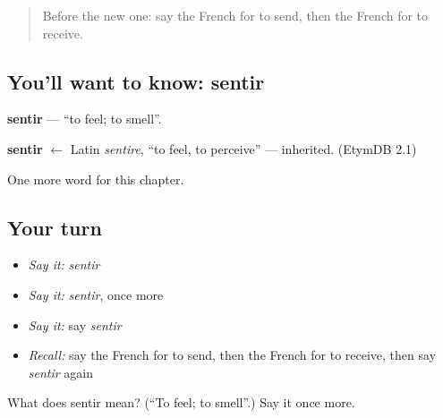 \begin{quote}
Before the new one: say the French for to send, then the French for to receive.
\end{quote}

\subsection*{You'll want to know: sentir}
\textbf{sentir} — \textquotedblleft{}to feel; to smell\textquotedblright{}.

\begin{cousinweb}
\textbf{sentir} $\leftarrow$ Latin \emph{sentire}, \textquotedblleft{}to feel, to perceive\textquotedblright{} — inherited. (EtymDB 2.1)
\end{cousinweb}

\begin{grammarlens}[title={What you've built}]
One more word for this chapter.
\end{grammarlens}

\subsection*{Your turn}
\begin{itemize}
\raggedright
  \item \emph{Say it:} \emph{sentir}
  \item \emph{Say it:} \emph{sentir}, once more
  \item \emph{Say it:} say \emph{sentir}
  \item \emph{Recall:} say the French for to send, then the French for to receive, then say \emph{sentir} again
\end{itemize}

\begin{tcolorbox}[breakable,colback=teal!4,colframe=teal!35!black,title={Before you move on}]
What does sentir mean? (\textquotedblleft{}To feel; to smell\textquotedblright{}.) Say it once more.
\end{tcolorbox}
